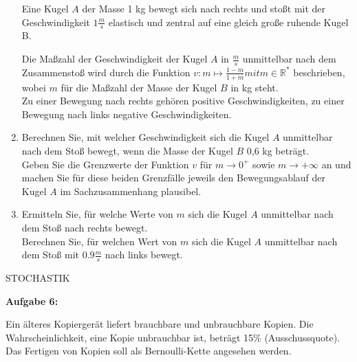 \documentclass[a4paper,12pt]{article}
\newcommand{\Aufgabe}[1]{
  {
  \vspace*{0.5cm}
  \textsf{\textbf{Aufgabe #1}}
  \vspace*{0.2cm}
  
  }
}
\begin{document}
\begin{enumerate}[label={\alph*)}]
Eine Kugel $A$ der Masse 1 kg bewegt sich nach rechts und stoßt mit der Geschwindigkeit $1\frac{m}{s}$ elastisch und zentral auf eine gleich große ruhende Kugel B.


    Die Maßzahl der Geschwindigkeit der Kugel $A$ in $\frac{m}{s}$ unmittelbar nach dem Zusammenstoß wird durch die Funktion $v: m\mapsto \frac{1-m}{1+m} mit m \in \mathbb{R}^*$ beschrieben, wobei $m$ für die Maßzahl der Masse der Kugel $B$ in kg steht.\\
Zu einer Bewegung nach rechts gehören positive Geschwindigkeiten, zu einer Bewegung nach links negative Geschwindigkeiten.

\item Berechnen Sie, mit welcher Geschwindigkeit sich die Kugel $A$ unmittelbar nach dem Stoß bewegt, wenn die Masse der Kugel $B$ 0,6 kg beträgt.\\
  Geben Sie die Grenzwerte der Funktion $v$ für $m \rightarrow 0^+$ sowie $m \rightarrow +\infty$ an und machen Sie für diese beiden Grenzfälle jeweils den Bewegungsablauf der Kugel $A$ im Sachzusammenhang plausibel.

\item Ermitteln Sie, für welche Werte von $m$ sich die Kugel $A$ unmittelbar nach dem Stoß nach rechts bewegt.\\
  Berechnen Sie, für welchen Wert von $m$ sich die Kugel $A$ unmittelbar nach dem Stoß mit $\num{0,9} \frac{m}{s}$ nach links bewegt.
\end{enumerate}

\newpage

STOCHASTIK

\Aufgabe{6:} 

Ein älteres Kopiergerät liefert brauchbare und unbrauchbare Kopien. Die Wahrscheinlichkeit, eine Kopie unbrauchbar ist, beträgt 15\% (Ausschussquote). Das Fertigen von Kopien soll als Bernoulli-Kette angesehen werden.
\end{document}
